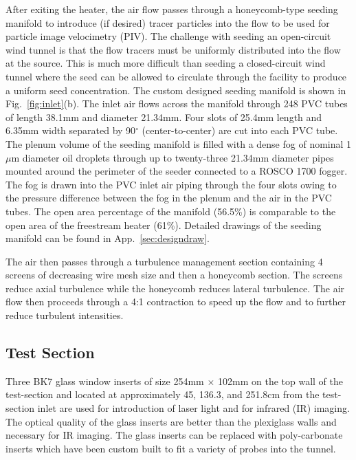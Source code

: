 After exiting the heater, the air flow passes through a honeycomb-type seeding manifold to introduce (if desired) tracer particles into the flow to be used for particle image velocimetry (PIV).
The challenge with seeding an open-circuit wind tunnel is that the flow tracers must be uniformly distributed into the flow at the source. 
This is much more difficult than seeding a closed-circuit wind tunnel where the seed can be allowed to circulate through the facility to produce a uniform seed concentration. 
The custom designed seeding manifold is shown in Fig.~\ref{fig:inlet}(b). 
The inlet air flows across the manifold through 248 PVC tubes of length 38.1mm and diameter 21.34mm. 
Four slots of 25.4mm length and 6.35mm width separated by 90$^\circ$ (center-to-center) are cut into each PVC tube. 
The plenum volume of the seeding manifold is filled with a dense fog of nominal 1$\mu$m  diameter oil droplets \cite{Shakerin1995} through up to twenty-three 21.34mm diameter pipes mounted around the perimeter of the seeder connected to a ROSCO 1700 fogger. 
The fog is drawn into the PVC inlet air piping through the four slots owing to the pressure difference between the fog in the plenum and the air in the PVC tubes. 
The open area percentage of the manifold (56.5\%) is comparable to the open area of the freestream heater (61\%). 
Detailed drawings of the seeding manifold can be found in App.~\ref{sec:designdraw}.

The air then passes through a turbulence management section containing 4 screens of decreasing wire mesh size and then a honeycomb section.
The screens reduce axial turbulence while the honeycomb reduces lateral turbulence.
The air flow then proceeds through a 4:1 contraction to speed up the flow and to further reduce turbulent intensities.

\subsection{Test Section}
Three BK7 glass window inserts of size 254mm $\times$ 102mm on the top wall of the test-section and located at approximately 45, 136.3, and 251.8cm from the test-section inlet are used for introduction of laser light and for infrared (IR) imaging. 
The optical quality of the glass inserts are better than the plexiglass walls and necessary for IR imaging.
The glass inserts can be replaced with poly-carbonate inserts which have been custom built to fit a variety of probes into the tunnel.

